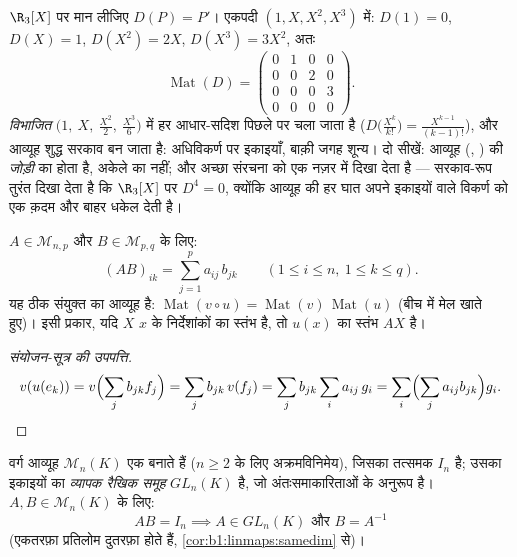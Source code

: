 \begin{example}[अवकलज, आव्यूह के रूप में]
\label{ex:b1:matrices:derivative}
$\R_3[X]$ पर मान लीजिए $D(P) = P'$। एकपदी  $(1, X, X^2, X^3)$ में: $D(1)
= 0$, $D(X) = 1$, $D(X^2) = 2X$, $D(X^3) = 3X^2$, अतः
\[
\operatorname{Mat}(D) =
\begin{pmatrix}
0 & 1 & 0 & 0\\
0 & 0 & 2 & 0\\
0 & 0 & 0 & 3\\
0 & 0 & 0 & 0
\end{pmatrix}.
\]
\emph{विभाजित}  $\bigl(1,\ X,\ \frac{X^2}2,\ \frac{X^3}6\bigr)$ में हर
आधार-सदिश पिछले पर चला जाता है ($D\bigl(\frac{X^k}{k!}\bigr) =
\frac{X^{k-1}}{(k-1)!}$), और आव्यूह शुद्ध सरकाव बन जाता है: अधिविकर्ण पर
इकाइयाँ, बाक़ी जगह शून्य। दो सीखें: आव्यूह (, ) की
\emph{जोड़ी} का होता है, अकेले  का नहीं; और अच्छा  संरचना को
एक नज़र में दिखा देता है --- सरकाव-रूप तुरंत दिखा देता है कि $\R_3[X]$ पर
$D^4 = 0$, क्योंकि आव्यूह की हर घात अपने इकाइयों वाले विकर्ण को एक क़दम और
बाहर धकेल देती है।
\end{example}

\begin{definition}[गुणनफल]\label{def:b1:matrices:product}
$A \in \mathcal{M}_{n,p}$ और $B \in \mathcal{M}_{p,q}$ के लिए:
\[
(AB)_{ik} = \sum_{j=1}^{p} a_{ij}\, b_{jk}
\qquad (1 \leq i \leq n,\ 1 \leq k \leq q).
\]
यह ठीक संयुक्त  का आव्यूह है: $\operatorname{Mat}(v \circ u) =
\operatorname{Mat}(v)\, \operatorname{Mat}(u)$ (बीच में  मेल खाते हुए)।
इसी प्रकार, यदि $X$ $x$ के निर्देशांकों का स्तंभ है, तो $u(x)$ का स्तंभ $AX$
है।
\end{definition}

\begin{proof}[संयोजन-सूत्र की उपपत्ति]
\[
v(u(e_k)) = v\Bigl(\sum_j b_{jk} f_j\Bigr) = \sum_j b_{jk}\, v(f_j)
= \sum_j b_{jk} \sum_i a_{ij}\, g_i
= \sum_i \Bigl(\sum_j a_{ij} b_{jk}\Bigr) g_i . \qedhere
\]
\end{proof}

\begin{proposition}\label{prop:b1:matrices:ring}
वर्ग आव्यूह $\mathcal{M}_n(K)$ एक  बनाते हैं ($n \geq 2$ के लिए
अक्रमविनिमेय), जिसका तत्समक $I_n$ है; उसका इकाइयों का  \emph{व्यापक
रैखिक समूह} $GL_n(K)$ है, जो 
अंतःसमाकारिताओं के अनुरूप है। $A, B \in \mathcal{M}_n(K)$ के लिए:
\[
AB = I_n \implies A \in GL_n(K) \text{ और } B = A^{-1}
\]
(एकतरफ़ा प्रतिलोम दुतरफ़ा होते हैं, \cref{cor:b1:linmaps:samedim} से)।
\end{proposition}


